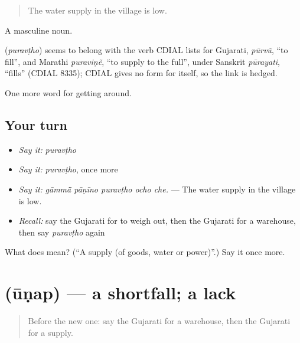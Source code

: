 \begin{quote}
The water supply in the village is low.
\end{quote}

A masculine noun.

\begin{cousinweb}
\textbf{} (\emph{puravṭho}) seems to belong with the verb CDIAL lists for Gujarati, \emph{pūrvũ}, \textquotedblleft{}to fill\textquotedblright{}, and Marathi \emph{puraviṇẽ}, \textquotedblleft{}to supply to the full\textquotedblright{}, under Sanskrit \emph{pūrayati}, \textquotedblleft{}fills\textquotedblright{} (CDIAL 8335); CDIAL gives no form for  itself, so the link is hedged.
\end{cousinweb}

\begin{grammarlens}[title={What you've built}]
One more word for getting around.
\end{grammarlens}

\subsection*{Your turn}
\begin{itemize}
\raggedright
  \item \emph{Say it:} \emph{puravṭho}
  \item \emph{Say it:} \emph{puravṭho}, once more
  \item \emph{Say it:} \emph{gāmmā̃ pāṇīno puravṭho ocho che.} — The water supply in the village is low.
  \item \emph{Recall:} say the Gujarati for to weigh out, then the Gujarati for a warehouse, then say \emph{puravṭho} again
\end{itemize}

\begin{tcolorbox}[breakable,colback=teal!4,colframe=teal!35!black,title={Before you move on}]
What does  mean? (\textquotedblleft{}A supply (of goods, water or power)\textquotedblright{}.) Say it once more.
\end{tcolorbox}
\section[\texorpdfstring{\gu{ઊણપ} (ūṇap)}{ઊણપ (ūṇap)}]{ (ūṇap) — a shortfall; a lack}

\label{lesson:GU-C431-unap}



\begin{quote}
Before the new one: say the Gujarati for a warehouse, then the Gujarati for a supply.
\end{quote}

